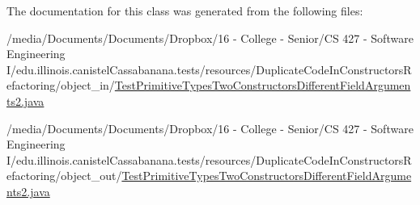 The documentation for this class was generated from the following files:\begin{DoxyCompactItemize}
\item 
/media/Documents/Documents/Dropbox/16 -\/ College -\/ Senior/CS 427 -\/ Software Engineering I/edu.illinois.canistelCassabanana.tests/resources/DuplicateCodeInConstructorsRefactoring/object\_\-in/\hyperlink{object__in_2TestPrimitiveTypesTwoConstructorsDifferentFieldArguments2_8java}{TestPrimitiveTypesTwoConstructorsDifferentFieldArguments2.java}\item 
/media/Documents/Documents/Dropbox/16 -\/ College -\/ Senior/CS 427 -\/ Software Engineering I/edu.illinois.canistelCassabanana.tests/resources/DuplicateCodeInConstructorsRefactoring/object\_\-out/\hyperlink{object__out_2TestPrimitiveTypesTwoConstructorsDifferentFieldArguments2_8java}{TestPrimitiveTypesTwoConstructorsDifferentFieldArguments2.java}\end{DoxyCompactItemize}
